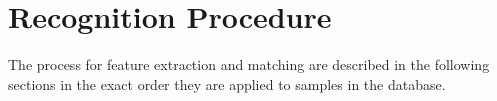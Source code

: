 
\chapter{Recognition Procedure\label{ch:methodology}}

The process for feature extraction and matching are described in the following sections in the exact order they are applied to samples in the database.




